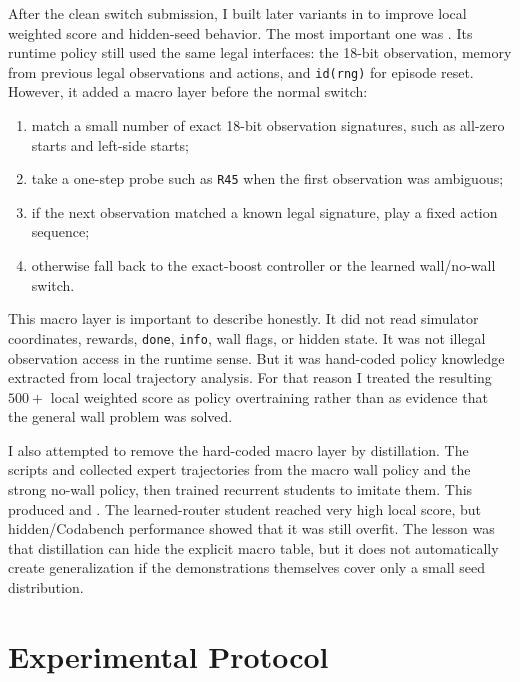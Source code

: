 \documentclass[11pt, oneside]{article}   	%
\begin{document}
After the clean switch submission, I built later variants in  to
improve local weighted score and hidden-seed behavior. The most important one was
. Its runtime policy still used the same legal
interfaces: the 18-bit observation, memory from previous legal observations and actions,
and \texttt{id(rng)} for episode reset. However, it added a macro layer before the normal
switch:
\begin{enumerate}[leftmargin=1.5em]
  \item match a small number of exact 18-bit observation signatures, such as all-zero
  starts and left-side starts;
  \item take a one-step probe such as \texttt{R45} when the first observation was
  ambiguous;
  \item if the next observation matched a known legal signature, play a fixed action
  sequence;
  \item otherwise fall back to the exact-boost controller or the learned wall/no-wall
  switch.
\end{enumerate}

This macro layer is important to describe honestly. It did not read simulator
coordinates, rewards, \texttt{done}, \texttt{info}, wall flags, or hidden state. It was
not illegal observation access in the runtime sense. But it was hand-coded policy
knowledge extracted from local trajectory analysis. For that reason I treated the
resulting \(500+\) local weighted score as policy overtraining rather than as evidence
that the general wall problem was solved.

I also attempted to remove the hard-coded macro layer by distillation. The scripts
 and  collected
expert trajectories from the macro wall policy and the strong no-wall policy, then
trained recurrent students to imitate them. This produced
 and
. The learned-router student reached
very high local score, but hidden/Codabench performance showed that it was still
overfit. The lesson was that distillation can hide the explicit macro table, but it does
not automatically create generalization if the demonstrations themselves cover only a
small seed distribution.

\section{Experimental Protocol}
\end{document}
